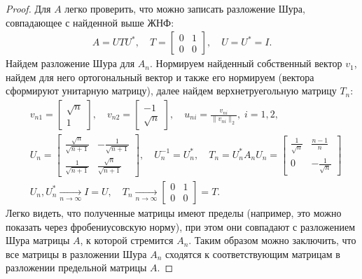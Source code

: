 \documentclass{article}
\newtheorem*{proof}{$\square$}
\begin{document}
\begin{proof}
			Для $A$ легко проверить, что можно записать разложение Шура, совпадающее с найденной выше ЖНФ:
			\begin{equation*}\begin{aligned}
				A = U T U^*,\quad T = \begin{bmatrix}
					0 & 1\\ 0 & 0
				\end{bmatrix},\quad U = U^* = I.
			\end{aligned}\end{equation*}
			Найдем разложение Шура для $A_n$. Нормируем найденный собственный вектор $v_1$, найдем для него ортогональный вектор и также его нормируем (вектора сформируют унитарную матрицу), далее найдем верхнетруегольную матрицу $T_n$:
			\begin{equation*}\begin{aligned}
			&v_{n1} = \begin{bmatrix}
				\sqrt{n}\\ 1
			\end{bmatrix},\quad
			v_{n2} = \begin{bmatrix}
				-1\\ \sqrt{n}
			\end{bmatrix},\quad
			u_{ni} = \frac{v_{ni}}{\|v_{ni}\|_2},\; i=1,2,\\
			&U_n = \begin{bmatrix}
				\frac{\sqrt{n}}{\sqrt{n+1}} & -\frac{1}{\sqrt{n+1}}\\ \frac{1}{\sqrt{n+1}} & \frac{\sqrt{n}}{\sqrt{n+1}}
			\end{bmatrix},\quad U_n^{-1} = U_n^*,\quad
			T_n = U_n^* A_n U_n = \begin{bmatrix}
				\frac{1}{\sqrt{n}} & \frac{n-1}{n}\\ 0 & -\frac{1}{\sqrt{n}}
			\end{bmatrix}\\
			&U_n, U_n^*\xrightarrow[n\to\infty]{} I = U, \quad T_n\xrightarrow[n\to\infty]{} \begin{bmatrix}
				0 & 1\\ 0 & 0
			\end{bmatrix} = T.
			\end{aligned}\end{equation*}
		Легко видеть, что полученные матрицы имеют пределы (например, это можно показать через фробениусовскую норму), при этом они совпадают с разложением Шура матрицы $A$, к которой стремится $A_n$. Таким образом можно заключить, что все матрицы в разложении Шура $A_n$ сходятся к соответствующим матрицам в разложении предельной матрицы $A$. 
		\end{proof}
		
\end{document}

